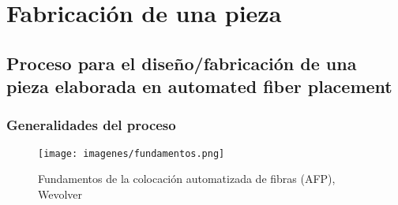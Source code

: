 \chapter{Fabricación de una pieza}
\label{capitulo 3: Pasos para la fabricacion de una pieza, equipo y materiales}

\section{Proceso para el diseño/fabricación de una pieza elaborada en automated fiber placement}

\subsection{Generalidades del proceso}

\begin{figure}[h]
    \centering
    \texttt{[image: imagenes/fundamentos.png]}
    \caption{Fundamentos de la colocación automatizada de fibras (AFP), Wevolver}
    \label{fig:enter-label}
\end{figure}

